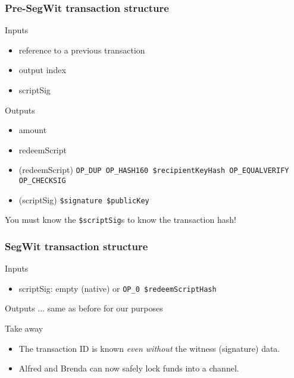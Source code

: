 \documentclass{beamer}
\begin{document}
\begin{frame}
	\frametitle{Pre-SegWit transaction structure}
	\begin{block}{Inputs}
		\begin{itemize}
			\item reference to a previous transaction \pause
			\item output index \pause
			\item scriptSig \pause
		\end{itemize}
	\end{block}
	\begin{block}{Outputs}
		\begin{itemize}
			\item amount \pause
			\item redeemScript \pause 
		\end{itemize}
	\end{block}
	\begin{example}[P2KH script]
		\begin{itemize}
			\item (redeemScript) {\tiny \texttt{OP\_DUP OP\_HASH160 \$recipientKeyHash OP\_EQUALVERIFY OP\_CHECKSIG}}
			\item (scriptSig) {\tiny\texttt{\$signature \$publicKey}} \pause
		\end{itemize}
  You must know the \texttt{\$scriptSig}s to know the transaction hash!
	\end{example}
\end{frame}
\begin{frame}
	\frametitle{SegWit transaction structure}
	\begin{block}{Inputs} 
		\begin{itemize}
			\item scriptSig: empty (native) or {\tiny \texttt{OP\_0 \$redeemScriptHash}} \pause
		\end{itemize}
	\end{block}
	\begin{block}{Outputs}
		... same as before for our purposes \pause
	\end{block}
	\begin{block}{Take away}
		\begin{itemize}
			\item The transaction ID is known \emph{even without} the witness (signature) data. \pause
			\item Alfred and Brenda can now safely lock funds into a channel.
		\end{itemize}
	\end{block}
\end{frame}
\end{document}
